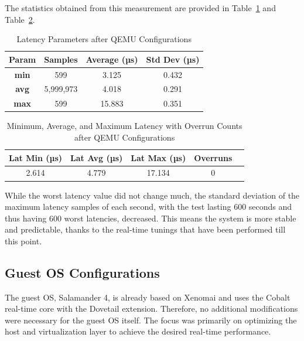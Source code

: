 \documentclass[MMR,Master,english]{style/twbook}
\begin{document}
\clearpage

\noindent The statistics obtained from this measurement are provided in Table~\ref{tab:latency_stats_virt_qemu} and Table~\ref{tab:latency_overrun_msw_new_virt_qemu}.

\begin{table}[H]
	\centering
	\caption{Latency Parameters after QEMU Configurations}
	\label{tab:latency_stats_virt_qemu}
	\begin{tabular}{|c|c|c|c|}
		\hline
		\textbf{Param} & \textbf{Samples} & \textbf{Average (µs)} & \textbf{Std Dev (µs)} \\ \hline
		\textbf{min}   & 599              & 3.125                 & 0.432                 \\ \hline
		\textbf{avg}   & 5,999,973        & 4.018                 & 0.291                 \\ \hline
		\textbf{max}   & 599              & 15.883                & 0.351                 \\ \hline
	\end{tabular}
\end{table}

\begin{table}[H]
	\centering
	\caption[Latency Statistics with Overrun Counts after QEMU Configurations]{Minimum, Average, and Maximum Latency with Overrun Counts after QEMU Configurations}
	\label{tab:latency_overrun_msw_new_virt_qemu}
	\begin{tabular}{|c|c|c|c|c|}
		\hline
		\textbf{Lat Min (µs)} & \textbf{Lat Avg (µs)} & \textbf{Lat Max (µs)} & \textbf{Overruns} \\ \hline
		2.614                 & 4.779                 & 17.134                & 0                 \\ \hline
	\end{tabular}
\end{table}

\noindent While the worst latency value did not change much, the standard deviation of the maximum latency samples of each second, with the test lasting 600 seconds and thus having 600 worst latencies, decreased. This means the system is more stable and predictable, thanks to the real-time tunings that have been performed till this point.

\subsection{Guest OS Configurations}\label{subsec:guest_configurations}
The guest OS, Salamander 4, is already based on Xenomai and uses the Cobalt real-time core with the Dovetail extension. Therefore, no additional modifications were necessary for the guest OS itself. The focus was primarily on optimizing the host and virtualization layer to achieve the desired real-time performance.
\end{document}
